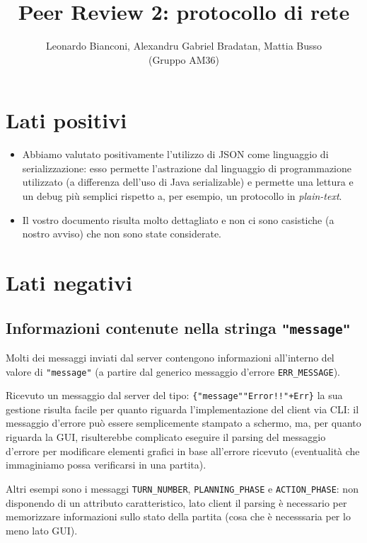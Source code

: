 \documentclass{article}
\title{Peer Review 2: protocollo di rete}
\author{Leonardo Bianconi, Alexandru Gabriel Bradatan, Mattia Busso \\(Gruppo AM36)}
\begin{document}
    \maketitle

    \section{Lati positivi}
        \begin{itemize}
            \item Abbiamo valutato positivamente l'utilizzo di JSON come linguaggio
                di serializzazione: esso permette l'astrazione dal linguaggio di 
                programmazione utilizzato (a differenza dell'uso di Java serializable)
                e permette una lettura e un debug più semplici rispetto a, per esempio,
                un protocollo in \textit{plain-text}.
            \item Il vostro documento risulta molto dettagliato e non ci sono casistiche
                (a nostro avviso) che non sono state considerate. 
        \end{itemize}

    \section{Lati negativi}
        \subsection{Informazioni contenute nella stringa \texttt{"message"}}
            Molti dei messaggi inviati dal server contengono informazioni
            all'interno del valore di \texttt{"message"} (a partire dal
            generico messaggio d'errore \texttt{ERR\_MESSAGE}).
            
            Ricevuto un messaggio dal server del tipo:
            \texttt{\{"message"\="Error!!"+Err\}} la sua gestione
            risulta facile per quanto riguarda l'implementazione del client via
            CLI: il messaggio d'errore può essere semplicemente stampato a schermo,
            ma, per quanto riguarda la GUI, risulterebbe complicato eseguire il
            parsing del messaggio d'errore per modificare elementi grafici in base
            all'errore ricevuto (eventualità che immaginiamo possa verificarsi
            in una partita).

            Altri esempi sono i messaggi \texttt{TURN\_NUMBER}, \texttt{PLANNING\_PHASE} e
            \texttt{ACTION\_PHASE}: non disponendo di un attributo caratteristico, lato
            client il parsing è necessario per memorizzare informazioni sullo stato
            della partita (cosa che è necesssaria per lo meno lato GUI).
\end{document}
